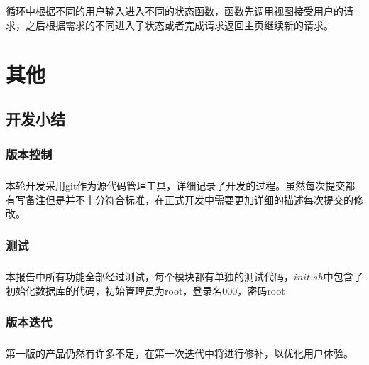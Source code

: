 \documentclass[notitlepage,cs4size,punct,oneside]{report}
\begin{document}
\begin{CJK}{UTF8}{hei}
\paragraph{}循环中根据不同的用户输入进入不同的状态函数，函数先调用视图接受用户的请求，之后根据需求的不同进入子状态或者完成请求返回主页继续新的请求。




\chapter{其他}
\section{开发小结}
\subsection{版本控制}
\paragraph{}本轮开发采用git作为源代码管理工具，详细记录了开发的过程。虽然每次提交都有写备注但是并不十分符合标准，在正式开发中需要更加详细的描述每次提交的修改。
\subsection{测试}
\paragraph{}本报告中所有功能全部经过测试，每个模块都有单独的测试代码，$init.sh$中包含了初始化数据库的代码，初始管理员为root，登录名000，密码root
\subsection{版本迭代}
\paragraph{}第一版的产品仍然有许多不足，在第一次迭代中将进行修补，以优化用户体验。
\pagebreak
\end{CJK}
\end{document}
